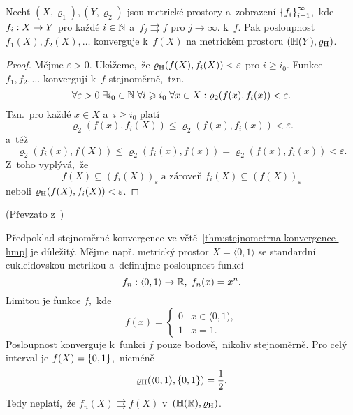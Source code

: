 \begin{theorem}\label{thm:stejnometrna-konvergence-hmp}
    Nechť $(X,\varrho_1),(Y,\varrho_2)$ jsou metrické prostory a~zobrazení $\left\{f_i\right\}_{i=1}^\infty$,~kde $f_i:X \rightarrow Y$ pro každé $i\in\mathbb{N}$ a~$f_j\rightrightarrows f$ pro $j\to\infty$. k~$f$. Pak posloupnost $f_1(X),f_2(X),\ldots$ konverguje k~$f(X)$ na metrickém prostoru $(\mathbb{H}(Y),\varrho_\textup{H})$.
\end{theorem}
\begin{proof}
    Mějme $\varepsilon>0$. Ukážeme,~že $\varrho_\textup{H}(f(X),f_i(X))<\varepsilon$ pro $i\geqslant i_0$. Funkce $f_1,f_2,\ldots$ konvergují k~$f$ stejnoměrně,~tzn.
    \[\forall\varepsilon>0\;\exists i_0\in\mathbb{N}\;\forall i\geqslant i_0\;\forall x\in X:\varrho_2(f(x),f_i(x))<\varepsilon.\]
    Tzn.~pro každé $x\in X$ a~$i\geqslant i_0$ platí
    \[\varrho_2(f(x),f_i(X))\leqslant\varrho_2(f(x),f_i(x))<\varepsilon.\]
    a~též
    \[\varrho_2(f_i(x),f(X))\leqslant\varrho_2(f_i(x),f(x))=\varrho_2(f(x),f_i(x))<\varepsilon.\]
    Z~toho vyplývá,~že
    \[f(X)\subseteq (f_i(X))_\varepsilon\;\text{a zároveň}\;f_i(X)\subseteq (f(X))_\varepsilon\]
    neboli $\varrho_\textup{H}(f(X),f_i(X))<\varepsilon$.
\end{proof}
(Převzato z~\citep[str. 74]{Edgar2008})
\begin{remark}
    Předpoklad stejnoměrné konvergence ve větě~\ref{thm:stejnometrna-konvergence-hmp} je důležitý. Mějme např. metrický prostor $X=\langle0,1\rangle$ se standardní eukleidovskou metrikou a~definujme posloupnost funkcí
    \[f_n:\langle0,1\rangle \rightarrow \mathbb{R},\;f_n(x)=x^n.\]
    Limitou je funkce $f$,~kde
    \[f(x) = \begin{cases}
        0 & x \in \langle0,1),\\
        1 & x = 1.
        \end{cases}\]
    Posloupnost konverguje k~funkci $f$ pouze bodově,~nikoliv stejnoměrně. Pro celý interval je $f(X)=\left\{0,1\right\}$,~nicméně
    \[\varrho_\textup{H}(\langle0,1\rangle,\left\{0,1\right\})=\dfrac{1}{2}.\]
    Tedy neplatí,~že $f_n(X)\rightrightarrows f(X)$ v~$(\mathbb{H}(\mathbb{R}),\varrho_\textup{H})$.
\end{remark}